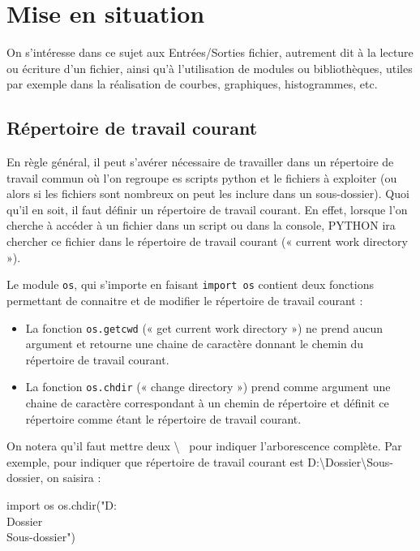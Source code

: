 \documentclass[a4paper,11pt,titlepage]{report}
\newcommand	{\type}		{TP}
\begin{document}

\pagestyle{fancy}


 \rhead{ \type}
\cfoot{\thepage/\pageref{LastPage}}

\section{Mise en situation}
On s'intéresse dans ce sujet aux Entrées/Sorties fichier, autrement dit à la lecture ou écriture d'un fichier, ainsi qu'à l'utilisation de modules ou bibliothèques, utiles par exemple dans la réalisation de courbes, graphiques, histogrammes, etc.

\subsection{Répertoire de travail courant}

En règle général, il peut s'avérer nécessaire de travailler dans un répertoire de travail commun où l'on regroupe es scripts python et le fichiers à exploiter (ou alors si les fichiers sont nombreux on peut les inclure dans un sous-dossier). Quoi qu'il en soit, il faut définir un répertoire de travail courant. 
En effet, lorsque l'on cherche à accéder à un fichier dans un script ou dans la console, PYTHON ira chercher ce fichier dans le répertoire de travail courant (« current work directory »).

Le module \texttt{os}, qui s'importe en faisant \texttt{import os}  contient deux fonctions permettant de connaitre et de modifier le répertoire de travail courant :
\begin{itemize}
\item La fonction \texttt{os.getcwd} (« get current work directory ») ne prend aucun argument et retourne une chaine de caractère donnant le chemin du répertoire de travail courant.
\item La fonction \texttt{os.chdir} (« change directory ») prend comme argument une chaine de caractère correspondant à un chemin de répertoire et définit ce répertoire comme étant le répertoire de travail courant. 
\end{itemize}
On notera qu'il faut mettre deux \og\textbackslash\fg{} \, pour indiquer l'arborescence complète. Par exemple, pour indiquer que répertoire de travail courant est \og D:\textbackslash Dossier\textbackslash Sous-dossier\fg{}, on saisira :
\begin{codePython}
import os
os.chdir("D:\\Dossier\\Sous-dossier")
\end{codePython}
\end{document}
